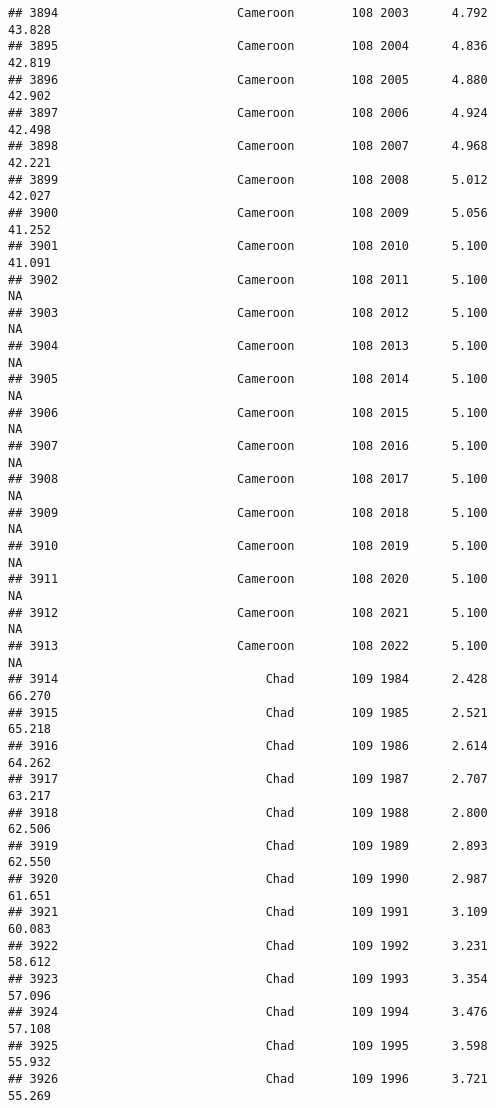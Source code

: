 \documentclass[
]{article}
\begin{document}
\begin{verbatim}
## 3894                         Cameroon        108 2003      4.792     43.828
## 3895                         Cameroon        108 2004      4.836     42.819
## 3896                         Cameroon        108 2005      4.880     42.902
## 3897                         Cameroon        108 2006      4.924     42.498
## 3898                         Cameroon        108 2007      4.968     42.221
## 3899                         Cameroon        108 2008      5.012     42.027
## 3900                         Cameroon        108 2009      5.056     41.252
## 3901                         Cameroon        108 2010      5.100     41.091
## 3902                         Cameroon        108 2011      5.100         NA
## 3903                         Cameroon        108 2012      5.100         NA
## 3904                         Cameroon        108 2013      5.100         NA
## 3905                         Cameroon        108 2014      5.100         NA
## 3906                         Cameroon        108 2015      5.100         NA
## 3907                         Cameroon        108 2016      5.100         NA
## 3908                         Cameroon        108 2017      5.100         NA
## 3909                         Cameroon        108 2018      5.100         NA
## 3910                         Cameroon        108 2019      5.100         NA
## 3911                         Cameroon        108 2020      5.100         NA
## 3912                         Cameroon        108 2021      5.100         NA
## 3913                         Cameroon        108 2022      5.100         NA
## 3914                             Chad        109 1984      2.428     66.270
## 3915                             Chad        109 1985      2.521     65.218
## 3916                             Chad        109 1986      2.614     64.262
## 3917                             Chad        109 1987      2.707     63.217
## 3918                             Chad        109 1988      2.800     62.506
## 3919                             Chad        109 1989      2.893     62.550
## 3920                             Chad        109 1990      2.987     61.651
## 3921                             Chad        109 1991      3.109     60.083
## 3922                             Chad        109 1992      3.231     58.612
## 3923                             Chad        109 1993      3.354     57.096
## 3924                             Chad        109 1994      3.476     57.108
## 3925                             Chad        109 1995      3.598     55.932
## 3926                             Chad        109 1996      3.721     55.269

\end{verbatim}
\end{document}
